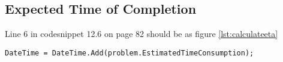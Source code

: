 \subsection*{Expected Time of Completion}
Line 6 in codesnippet 12.6 on page 82 should be as figure \ref{lst:calculateeta}

\begin{lstlisting}[style=sourceCode, caption=\myCaption{The CalculateETA method}, label=lst:calculateeta,float=h]
DateTime = DateTime.Add(problem.EstimatedTimeConsumption);
     
\end{lstlisting}
